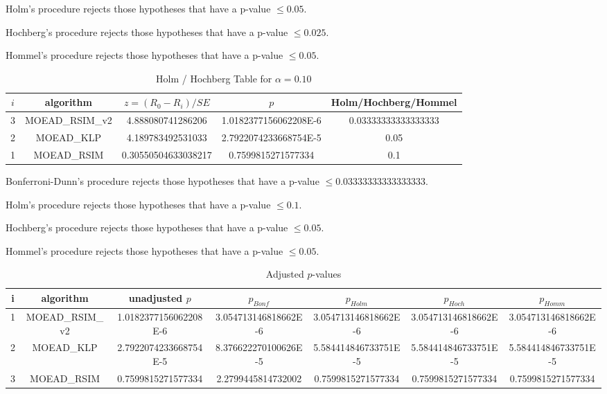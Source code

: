 \documentclass[a4paper,10pt]{article}
\begin{document}
\begin{landscape}
Holm's procedure rejects those hypotheses that have a p-value $\le0.05$.


Hochberg's procedure rejects those hypotheses that have a p-value $\le0.025$.


Hommel's procedure rejects those hypotheses that have a p-value $\le0.05$.


\begin{table}[!htp]
\centering\tiny
\caption{Holm / Hochberg Table for $\alpha=0.10$}
\begin{tabular}{ccccc}
$i$&algorithm&$z=(R_0 - R_i)/SE$&$p$&Holm/Hochberg/Hommel\\
\hline
3&MOEAD_RSIM_v2&4.888080741286206&1.0182377156062208E-6&0.03333333333333333\\
2&MOEAD_KLP&4.189783492531033&2.7922074233668754E-5&0.05\\
1&MOEAD_RSIM&0.30550504633038217&0.7599815271577334&0.1\\
\hline
\end{tabular}
\end{table}
Bonferroni-Dunn's procedure rejects those hypotheses that have a p-value $\le0.03333333333333333$.


Holm's procedure rejects those hypotheses that have a p-value $\le0.1$.


Hochberg's procedure rejects those hypotheses that have a p-value $\le0.05$.


Hommel's procedure rejects those hypotheses that have a p-value $\le0.05$.


\begin{table}[!htp]
\centering\tiny
\caption{Adjusted $p$-values}
\begin{tabular}{ccccccc}
i&algorithm&unadjusted $p$&$p_{Bonf}$&$p_{Holm}$&$p_{Hoch}$&$p_{Homm}$\\
\hline
1&MOEAD_RSIM_v2&1.0182377156062208E-6&3.054713146818662E-6&3.054713146818662E-6&3.054713146818662E-6&3.054713146818662E-6\\
2&MOEAD_KLP&2.7922074233668754E-5&8.376622270100626E-5&5.584414846733751E-5&5.584414846733751E-5&5.584414846733751E-5\\
3&MOEAD_RSIM&0.7599815271577334&2.2799445814732002&0.7599815271577334&0.7599815271577334&0.7599815271577334\\
\hline
\end{tabular}
\end{table}


\end{landscape}
\end{document}
